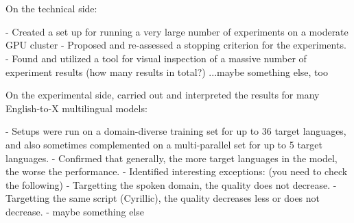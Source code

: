\chapter*{}

On the technical side:

- Created a set up for running a very large number of experiments on a moderate GPU cluster
- Proposed and re-assessed a stopping criterion for the experiments.
- Found and utilized a tool for visual inspection of a massive number of experiment results (how many results in total?)
...maybe something else, too

On the experimental side, carried out and interpreted the results for many English-to-X multilingual models:

- Setups were run on a domain-diverse training set for up to 36 target languages, and also sometimes complemented on a multi-parallel set for up to 5 target languages.
- Confirmed that generally, the more target languages in the model, the worse the performance.
- Identified interesting exceptions:
  (you need to check the following)
  - Targetting the spoken domain, the quality does not decrease.
  - Targetting the same script (Cyrillic), the quality decreases less or does not decrease.
  - maybe something else
